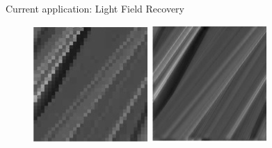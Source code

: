 \begin{frame}{Current application: Light Field Recovery}
\begin{figure}[!tbp]
\begin{minipage}[b]{0.32\textwidth}
    \includegraphics[width=\textwidth]{./Images/EPI_wavelet}
  \end{minipage}
\pause
	 \begin{minipage}[b]{0.32\textwidth}
    \includegraphics[width=\textwidth]{./Images/EPI_shearlet}
	\end{minipage}
\end{figure}

\end{frame}

